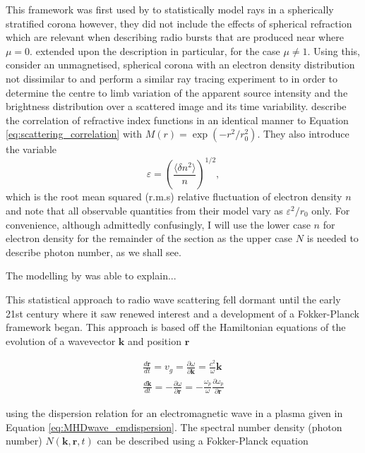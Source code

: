 This framework was first used by \cite{Fokker1965} to statistically model rays in a spherically stratified corona however, they did not include the effects of spherical refraction which are relevant when describing radio bursts that are produced near where $\mu = 0$. \cite{Hollweg1967} extended upon the \cite{Chandrasekhar1952} description in particular, for the case $\mu \neq 1$. Using this, \cite{Steinberg1971} consider an unmagnetised, spherical corona with an electron density distribution not dissimilar to \cite{Newkirk1961} and perform a similar ray tracing experiment to \cite{Fokker1965} in order to determine the centre to limb variation of the apparent source intensity and the brightness distribution over a scattered image and its time variability. \cite{Steinberg1971} describe the correlation of refractive index functions in an identical manner to Equation \ref{eq:scattering_correlation} with $M(r) =  \exp{(-r^2/r_0^2)}$. They also introduce the variable 
$$
\varepsilon =\left( \frac{\langle \delta n^2 \rangle}{n}\right)^{1/2},
$$
which is the root mean squared (r.m.s) relative fluctuation of electron density $n$ and note that all observable quantities from their model vary as $\varepsilon^2/r_0$ only. For convenience, although admittedly confusingly, I will use the lower case $n$ for electron density for the remainder of the section as the upper case $N$ is needed to describe photon number, as we shall see.

The modelling by \cite{Steinberg1971} was able to explain...

This statistical approach to radio wave scattering fell dormant until the early 21st century where it saw renewed interest and a development of a Fokker-Planck framework began. This approach is based off the Hamiltonian equations of the evolution of a wavevector $\mathbf{k}$ and position $\mathbf{r}$

\begin{align}
\frac{d \mathbf{r}}{dt} = v_g = \frac{\partial \omega}{\partial \mathbf{k}} = \frac{c^2}{\omega} \mathbf{k} \label{eq:scattering_Hamiltonian_r}\\
\frac{d \mathbf{k}}{dt} = - \frac{\partial \omega}{\partial \mathbf{r}} = - \frac{\omega_p}{\omega}\frac{\partial \omega_p}{\partial \mathbf{r}} \label{eq:scattering_Hamiltonian_k}
\end{align}

using the dispersion relation for an electromagnetic wave in a plasma given in Equation \ref{eq:MHDwave_emdispersion}. The spectral number density (photon number) $N(\mathbf{k}, \mathbf{r}, t)$ can be described using a Fokker-Planck equation

